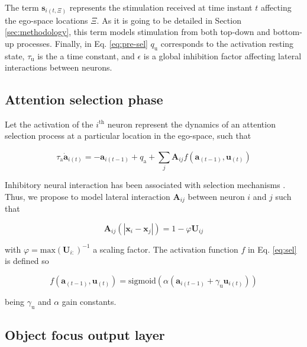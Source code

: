\documentclass[letterpaper, 10 pt, conference]{ieeeconf}  %
\begin{document}
	The term $\mathbf{s}_{i(t,\Xi)}$ represents the stimulation received at time instant $t$ affecting the ego-space locations $\Xi$. As it is going to be detailed in Section \ref{sec:methodology}, this term models stimulation from both top-down and bottom-up processes. Finally, in Eq. \eqref{eq:pre-sel} $q_\mathrm{u}$ corresponds to the activation resting state, $\tau_\mathrm{u}$ is the a time constant, and $\epsilon$ is a global inhibition factor affecting lateral interactions between neurons.
	 
	\subsection{Attention selection phase}
	
	Let the activation of the $i^\mathrm{th}$ neuron represent the dynamics of an attention selection process at a particular location in the ego-space, such that 
	
	\begin{equation}
	\tau_\mathrm{a} \dot{\mathbf{a}}_{i(t)} = -\mathbf{a}_{i(t-1)} + q_\mathrm{a} + \sum_{j}^{} \mathbf{A}_{ij}f\left(\mathbf{a}_{(t-1)}, \mathbf{u}_{(t)}\right) 
	\label{eq:sel}
	\end{equation}
	
	\noindent Inhibitory neural interaction has been associated with selection mechanisms \cite{schoner2016}. Thus, we propose to model lateral interaction $\mathbf{A}_{ij}$ between neuron $i$ and $j$ such that

	\begin{equation}
	\mathbf{A}_{ij}(|\mathbf{x}_i-\mathbf{x}_j|) = 1 - \varphi\mathbf{U}_{ij}	
	\label{eq:sel-syn}
	\end{equation}
	
	\noindent with $\varphi = \mathrm{max}(\mathbf{U}_{i:})^{-1}$ a scaling factor. The activation function $f$ in Eq. \eqref{eq:sel} is defined so

	\begin{equation}
	f\left(\mathbf{a}_{(t-1)}, \mathbf{u}_{(t)}\right) = \mathrm{sigmoid} \left(\alpha \left(\mathbf{a}_{i(t-1)} + \gamma_\mathrm{u} \mathbf{u}_{i(t)}\right)\right)
	\label{eq:sel-fa}
	\end{equation}
	
	\noindent being $\gamma_\mathrm{u}$ and $\alpha$ gain constants.
	
	\subsection{Object focus output layer}
	
\end{document}
